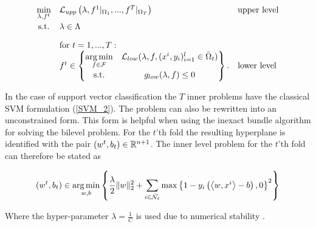 
\begin{equation}
	\begin{array}{cll}
	\displaystyle\min_{\lambda, f^t} & \mathcal{L}_{upp}\left(\lambda,f^1|_{\Omega_1},...,f^T|_{\Omega_T}\right) & \text{upper level} \vspace{0.5ex}\\
	\text{s.t.} & \lambda \in \Lambda & \vspace{1em}\\
	& \text{for } t = 1,...,T: & \\
	& f^t \in \begin{Bmatrix} \displaystyle\argmin_{f\in \mathcal{F}} & \mathcal{L}_{low}(\lambda,f,(x^i,y_i)_{i = 1}^l\in \bar{\Omega}_t) \vspace{0.5ex}\\
	                        \text{s.t.} & g_{low}(\lambda,f) \leq 0 
													\end{Bmatrix}. & \text{lower level}
	\end{array}
\end{equation}

In the case of support vector classification the \(T\) inner problems have the classical SVM formulation %
(\ref{SVM_2}). %
The problem can also be rewritten into an unconstrained form. This form is helpful when using the inexact bundle algorithm for solving the bilevel problem.
For the \(t\)'th fold the resulting hyperplane is identified with the pair \((w^t,b_t) \in \mathbb{R}^{n+1}\).
The inner level problem for the \(t\)'th fold can therefore be stated as



\begin{equation}
	(w^t,b_t) \in \operatorname*{arg\,min}_{w,b} \left\{\frac{\lambda}{2} \|w\|^2_2+\sum_{i\in \bar{\mathcal{N}}_t}{\max\left\{1-y_i\left(\left\langle w,x^i\right\rangle-b\right),0\right\}^2}\right\}
\label{lower_t_2}
\end{equation}

Where the hyper-parameter \(\lambda = \frac{1}{C}\) is used  due to numerical stability \cite[p. 38]{Kunapuli2008}.

